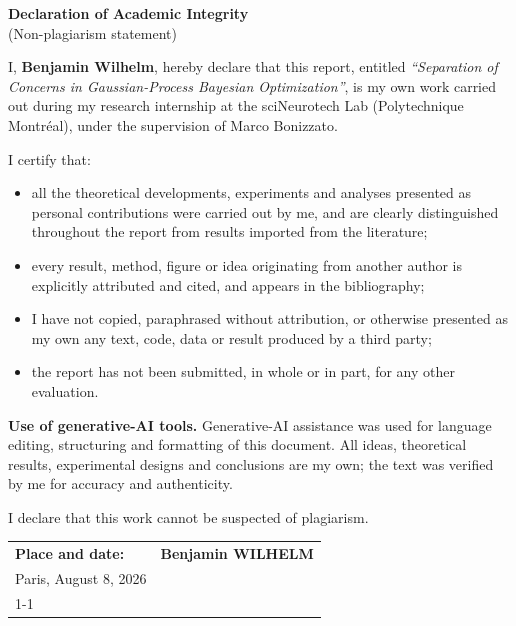\newpage
\thispagestyle{empty}
\vspace*{2cm}

\begin{center}
  {\LARGE\bfseries Declaration of Academic Integrity}\\[0.3cm]
  {\large (Non-plagiarism statement)}
\end{center}

\vspace{1.2cm}

\noindent I, \textbf{Benjamin Wilhelm}, hereby declare that this report, entitled
\emph{``Separation of Concerns in Gaussian-Process Bayesian Optimization''},
is my own work carried out during my research internship at the sciNeurotech Lab
(Polytechnique Montr\'eal), under the supervision of Marco Bonizzato.

\vspace{0.6cm}

\noindent I certify that:
\begin{itemize}
  \item all the theoretical developments, experiments and analyses presented as
        personal contributions were carried out by me, and are clearly
        distinguished throughout the report from results imported from the
        literature;
  \item every result, method, figure or idea originating from another author is
        explicitly attributed and cited, and appears in the bibliography;
  \item I have not copied, paraphrased without attribution, or otherwise
        presented as my own any text, code, data or result produced by a third
        party;
  \item the report has not been submitted, in whole or in part, for any other
        evaluation.
\end{itemize}

\vspace{0.6cm}

\vspace{0.6cm}

\noindent \textbf{Use of generative-AI tools.} Generative-AI assistance was used
for language editing, structuring and formatting of this document. All ideas,
theoretical results, experimental designs and conclusions are my own; the text
was verified by me for accuracy and authenticity.

\vspace{0.1cm}
I declare that this work cannot be suspected of plagiarism.

\vspace{2.5cm}
\noindent
\begin{tabular}{@{}p{}p{}@{}}
  \textbf{Place and date:} & \textbf{ Benjamin WILHELM} \\[0.2cm]
  Paris, August 8, 2026 & \\[1.4cm]
  \cline{1-1}\cline{2-2}
\end{tabular}

\newpage
